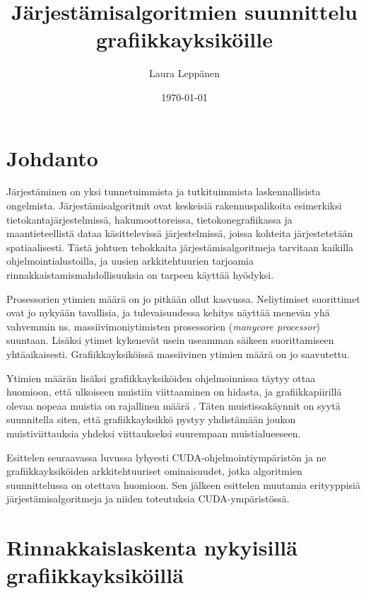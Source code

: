 \documentclass[a4paper,11pt]{article}
\newcommand{\engl}[1]{\foreignlanguage{english}{\em #1}}
\begin{document}
\title{Järjestämisalgoritmien suunnittelu grafiikkayksiköille}
\author{Laura Leppänen}
\date{\today}
\maketitle
\thispagestyle{empty}

\tableofcontents
\onehalfspacing

\newpage
\setcounter{page}{1}

\section{Johdanto}

Järjestäminen on yksi tunnetuimmista ja tutkituimmista laskennallisista ongelmista. Järjestämisalgoritmit ovat keskeisiä rakennuspalikoita esimerkiksi tietokantajärjestelmissä, hakumoottoreissa, tietokonegrafiikassa ja maantieteellistä dataa käsittelevissä järjestelmissä, joissa kohteita järjestetetään spatiaalisesti. Tästä johtuen tehokkaita järjestämisalgoritmeja tarvitaan kaikilla ohjelmointialustoilla, ja uusien arkkitehtuurien tarjoamia rinnakkaistamismahdollisuuksia on tarpeen käyttää hyödyksi.

Prosessorien ytimien määrä on jo pitkään ollut kasvussa. Neliytimiset suorittimet ovat jo nykyään tavallisia, ja tulevaisuudessa kehitys näyttää menevän yhä vahvemmin ns. massiivimoniytimisten prosessorien (\engl{manycore processor}) suuntaan. Lisäksi ytimet kykenevät usein useamman säikeen suorittamiseen yhtäaikaisesti. Grafiikkayksiköissä massiivinen ytimien määrä on jo saavutettu.

Ytimien määrän lisäksi grafiikkayksiköiden ohjelmoinnissa täytyy ottaa huomioon, että ulkoiseen muistiin viittaaminen on hidasta, ja grafiikkapiirillä olevaa nopeaa muistia on rajallinen määrä \cite{leischner2010}. Täten muistissakäynnit on syytä suunnitella siten, että grafiikkayksikkö pystyy yhdistämään joukon muistiviittauksia yhdeksi viittaukseksi suurempaan muistialueeseen.

Esittelen seuraavassa luvussa lyhyesti CUDA-ohjelmointiympäristön ja ne grafiikkayksiköiden arkkitehtuuriset ominaisuudet, jotka algoritmien suunnittelussa on otettava huomioon. Sen jälkeen esittelen muutamia erityyppisiä järjestämisalgoritmeja ja niiden toteutuksia CUDA-ympäristössä.

\section{Rinnakkaislaskenta nykyisillä grafiikkayksiköillä}
\end{document}
